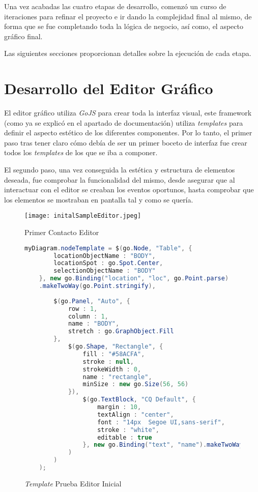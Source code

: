 Una vez acabadas las cuatro etapas de desarrollo, comenzó un curso de iteraciones para refinar el proyecto e ir dando la complejidad final al mismo, de forma que se fue completando toda la lógica de negocio, así como, el aspecto gráfico final.

Las siguientes secciones proporcionan detalles sobre la ejecución de cada etapa.

\section{Desarrollo del Editor Gráfico}

El editor gráfico utiliza \emph{GoJS} para crear toda la interfaz visual, este framework (como ya se explicó en el apartado de documentación) utiliza \emph{templates} para definir el aspecto estético de los diferentes componentes. Por lo tanto, el primer paso tras tener claro cómo debía de ser un primer boceto de interfaz fue crear todos los \emph{templates} de los que se iba a componer.

El segundo paso, una vez conseguida la estética y estructura de elementos deseada, fue comprobar la funcionalidad del mismo, desde asegurar que al interactuar con el editor se creaban los eventos oportunos, hasta comprobar que los elementos se mostraban en pantalla tal y como se quería.

\begin{figure}[!tb]
	\centering
	\texttt{[image: initalSampleEditor.jpeg]}
	\caption{Primer Contacto Editor}
	\label{fig:initialSampleEditor}
\end{figure}

\begin{figure}[!tb]
	\centering
	\begin{lstlisting}[language=Java]
	myDiagram.nodeTemplate = $(go.Node, "Table", {
		locationObjectName : "BODY",
		locationSpot : go.Spot.Center,
		selectionObjectName : "BODY"
	}, new go.Binding("location", "loc", go.Point.parse)
	.makeTwoWay(go.Point.stringify),
	
		$(go.Panel, "Auto", {
			row : 1,
			column : 1,
			name : "BODY",
			stretch : go.GraphObject.Fill
		}, 
			$(go.Shape, "Rectangle", {
				fill : "#58ACFA",
				stroke : null,
				strokeWidth : 0,
				name : "rectangle",
				minSize : new go.Size(56, 56)
			}), 
				$(go.TextBlock, "CQ Default", {
					margin : 10,
					textAlign : "center",
					font : "14px  Segoe UI,sans-serif",
					stroke : "white",
					editable : true
				}, new go.Binding("text", "name").makeTwoWay()
			)
		)
	);\end{lstlisting}
	\caption{\emph{Template} Prueba Editor Inicial}
	\label{fig:initialSampleEditorCode}
\end{figure}

